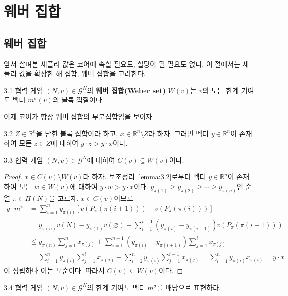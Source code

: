 \documentclass{article}
\numberwithin{equation}{section}
\begin{document}
\section{웨버 집합}
\subsection{웨버 집합}
앞서 살펴본 섀플리 값은 코어에 속할 필요도, 할당이 될 필요도 없다. 이 절에서는 섀플리 값을 확장한 해 집합, 웨버 집합을 고려한다.

\begin{dfn}{}{3.1}
	협력 게임 $(N,v)\in\mathcal G^N$의 \textbf{웨버 집합(Weber set)} $W(v)$는 $v$의 모든 한계 기여도 벡터 $m^\sigma(v)$의 볼록 껍질이다. 
\end{dfn}

이제 코어가 항상 웨버 집합의 부분집합임을 보이자.

\begin{lemma}{}{3.2}
	$Z\in\mathbb R^n$을 닫힌 볼록 집합이라 하고, $x\in\mathbb R^n\setminus Z$라 하자. 그러면 벡터 $y\in\mathbb R^n$이 존재하여 모든 $z\in Z$에 대하여 $y\cdot z>y\cdot x$이다.
\end{lemma}

\begin{thm}{}{3.3}
	협력 게임 $(N,v)\in\mathcal G^N$에 대하여 $C(v)\subseteq W(v)$이다.
\end{thm}

\begin{proof}
	$x\in C(v)\setminus W(v)$라 하자. 보조정리 \ref{lemma:3.2}로부터 벡터 $y\in\mathbb R^n$이 존재하여 모든 $w\in W(v)$에 대하여 $y\cdot w>y\cdot x$이다. $y_{\pi(1)}\geq y_{\pi(2)}\geq\cdots\geq y_{\pi(n)}$인 순열 $\pi\in\Pi(N)$을 고르자. $x\in C(v)$이므로
	\[
		\begin{aligned}
			y\cdot m^\pi&=\sum_{i=1}^ny_{\pi(i)}[v(P_\pi(\pi(i+1)))-v(P_\pi(\pi(i)))]\\
			&=y_{\pi(n)}v(N)-y_{\pi(1)}v(\varnothing)+\sum_{i=1}^{n-1}(y_{\pi(i)}-y_{\pi(i+1)})v(P_\pi(\pi(i+1)))\\
			&\leq y_{\pi(n)}\sum_{j=1}^nx_{\pi(j)}+\sum_{i=1}^{n-1}(y_{\pi(i)}-y_{\pi(i+1)})\sum_{j=1}^ix_{\pi(j)}\\
			&=\sum_{i=1}^ny_{\pi(i)}\sum_{j=1}^ix_{\pi(j)}-\sum_{i=2}^ny_{\pi(i)}\sum_{j=1}^{i-1}x_{\pi(j)}=\sum_{i=1}^ny_{\pi(i)}x_{\pi(i)}=y\cdot x
		\end{aligned}
	\]
	이 성립하나 이는 모순이다. 따라서 $C(v)\subseteq W(v)$이다.
\end{proof}

\begin{prob}{}{3.4}
	협력 게임 $(N,v)\in\mathcal G^N$의 한계 기여도 벡터 $m^\sigma$를 배당으로 표현하라.
\end{prob}
\end{document}

